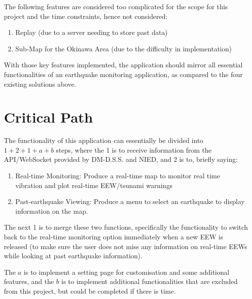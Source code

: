 The following features are considered too complicated for the scope for this project and the time constraints, hence not considered:
\begin{enumerate}
    \item Replay (due to a server needing to store past data)
    \item Sub-Map for the Okinawa Area (due to the difficulty in implementation)
\end{enumerate}

With those key features implemented, the application should mirror all essential functionalities of an earthquake monitoring application, as compared to the four existing solutions above.

\section{Critical Path}

The functionality of this application can essentially be divided into \(1+2+1+a+b\) steps, where the 1 is to receive information from the API/WebSocket provided by DM-D.S.S. and NIED, and 2 is to, briefly saying:
\begin{enumerate}
    \item Real-time Monitoring: Produce a real-time map to monitor real time vibration and plot real-time EEW/tsunami warnings
    \item Past-earthquake Viewing: Produce a menu to select an earthquake to display information on the map.
\end{enumerate}

The next 1 is to merge these two functions, specifically the functionality to switch back to the real-time monitoring option immediately when a new EEW is released (to make sure the user does not miss any information on real-time EEWs while looking at past earthquake information).

The \(a\) is to implement a setting page for customisation and some additional features, and the \(b\) is to implement additional functionalities that are excluded from this project, but could be completed if there is time.

